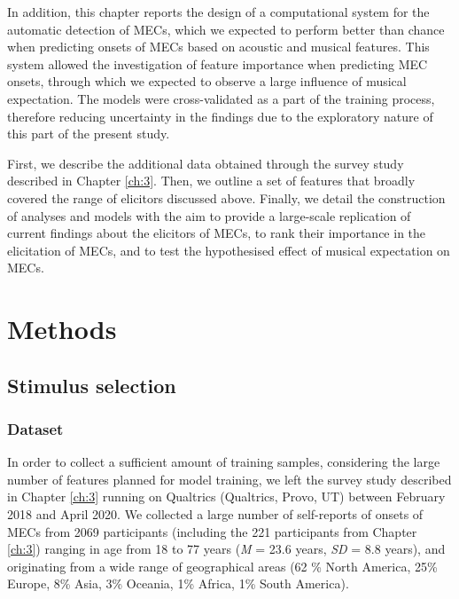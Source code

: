 In addition, this chapter reports the design of a computational system for the automatic detection of MECs, which we expected to perform better than chance when predicting onsets of MECs based on acoustic and musical features. This system allowed the investigation of feature importance when predicting MEC onsets, through which we expected to observe a large influence of musical expectation. The models were cross-validated as a part of the training process, therefore reducing uncertainty in the findings due to the exploratory nature of this part of the present study.

First, we describe the additional data obtained through the survey study described in Chapter \ref{ch:3}. Then, we outline a set of features that broadly covered the range of elicitors discussed above. Finally, we detail the construction of analyses and models with the aim to provide a large-scale replication of current findings about the elicitors of MECs, to rank their importance in the elicitation of MECs, and to test the hypothesised effect of musical expectation on MECs.

\section{Methods}
\label{se:exp-methods}

\subsection{Stimulus selection}

\subsubsection{Dataset}

In order to collect a sufficient amount of training samples, considering the large number of features planned for model training, we left the survey study described in Chapter \ref{ch:3} running on Qualtrics (Qualtrics, Provo, UT) between February 2018 and April 2020. We collected a large number of self-reports of onsets of MECs from 2069 participants (including the 221 participants from Chapter \ref{ch:3}) ranging in age from 18 to 77 years (\emph{M} = 23.6 years, \emph{SD} = 8.8 years), and originating from a wide range of geographical areas (62 \% North America, 25\% Europe, 8\% Asia, 3\% Oceania, 1\% Africa, 1\% South America).

